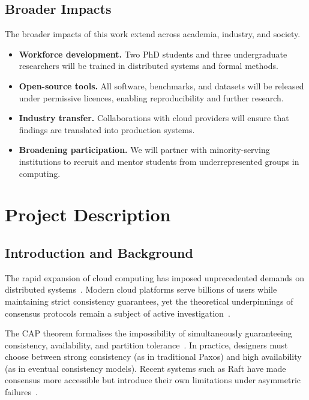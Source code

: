 \documentclass[
    language=english,
    doctype=grant-proposal,
    institution=none,
]{../../omnilatex}
\begin{document}
\subsection*{Broader Impacts}
The broader impacts of this work extend across academia, industry, and
society.
\begin{itemize}
    \item \textbf{Workforce development.} Two PhD students and three
          undergraduate researchers will be trained in distributed systems
          and formal methods.
    \item \textbf{Open-source tools.} All software, benchmarks, and
          datasets will be released under permissive licences, enabling
          reproducibility and further research.
    \item \textbf{Industry transfer.} Collaborations with cloud providers
          will ensure that findings are translated into production systems.
    \item \textbf{Broadening participation.} We will partner with
          minority-serving institutions to recruit and mentor students
          from underrepresented groups in computing.
\end{itemize}

\newpage

\section*{Project Description}

\subsection{Introduction and Background}
The rapid expansion of cloud computing has imposed unprecedented demands on
distributed systems~\cite{bibid}.  Modern cloud platforms serve billions of
users while maintaining strict consistency guarantees, yet the theoretical
underpinnings of consensus protocols remain a subject of active
investigation~\cite{goossensLaTeXCompanion1993}.

The CAP theorem formalises the impossibility of simultaneously guaranteeing
consistency, availability, and partition tolerance~\cite{einstein1905}.
In practice, designers must choose between strong consistency (as in
traditional Paxos) and high availability (as in eventual consistency
models).  Recent systems such as Raft have made consensus more accessible
but introduce their own limitations under asymmetric
failures~\cite{knuthFundamentalAlgorithms1973}.
\end{document}
